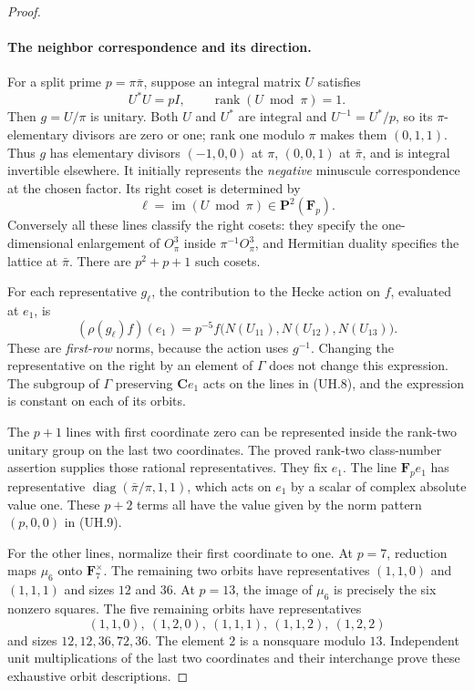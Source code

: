 \documentclass[11pt,a4paper]{article}
\theoremstyle{definition}
\begin{document}
\begin{proof}
\paragraph{The neighbor correspondence and its direction.}
For a split prime $p=\pi\bar\pi$, suppose an integral matrix $U$
satisfies
\[
 U^*U=pI,\qquad \operatorname{rank}(U\bmod\pi)=1.
 \tag{UH.7}
\]
Then $g=U/\pi$ is unitary.  Both $U$ and $U^*$ are integral and
$U^{-1}=U^*/p$, so its $\pi$-elementary divisors are zero or one;
rank one modulo $\pi$ makes them $(0,1,1)$.  Thus $g$ has elementary
divisors $(-1,0,0)$ at $\pi$, $(0,0,1)$ at $\bar\pi$, and is integral
invertible elsewhere.  It initially represents the \emph{negative}
minuscule correspondence at the chosen factor.  Its right coset is
determined by
\[
    \ell=\operatorname{im}(U\bmod\pi)\in\mathbf P^2(\mathbf F_p).
 \tag{UH.8}
\]
Conversely all these lines classify the right cosets: they specify
the one-dimensional enlargement of $O_\pi^3$ inside
$\pi^{-1}O_\pi^3$, and Hermitian duality specifies the lattice at
$\bar\pi$.  There are $p^2+p+1$ such cosets.

For each representative $g_\ell$, the contribution to the Hecke action
on $f$, evaluated at $e_1$, is
\[
 (\rho(g_\ell)f)(e_1)
   =p^{-5}f\bigl(N(U_{11}),N(U_{12}),N(U_{13})\bigr).
 \tag{UH.9}
\]
These are \emph{first-row} norms, because the action uses $g^{-1}$.
Changing the representative on the right by an element of $\Gamma$
does not change this expression.  The subgroup of $\Gamma$ preserving
$\mathbf Ce_1$ acts on the lines in (UH.8), and the expression is
constant on each of its orbits.

The $p+1$ lines with first coordinate zero can be represented inside
the rank-two unitary group on the last two coordinates.  The proved
rank-two class-number assertion supplies those rational representatives.
They fix $e_1$.  The line $\mathbf F_pe_1$ has representative
$\operatorname{diag}(\bar\pi/\pi,1,1)$, which acts on $e_1$ by a scalar
of complex absolute value one.  These $p+2$ terms all have the value
given by the norm pattern $(p,0,0)$ in (UH.9).

For the other lines, normalize their first coordinate to one.  At
$p=7$, reduction maps $\mu_6$ onto $\mathbf F_7^\times$.  The remaining
two orbits have representatives $(1,1,0)$ and $(1,1,1)$ and sizes
$12$ and $36$.  At $p=13$, the image of $\mu_6$ is precisely the six
nonzero squares.  The five remaining orbits have representatives
\[
 (1,1,0),\ (1,2,0),\ (1,1,1),\ (1,1,2),\ (1,2,2)
\]
and sizes $12,12,36,72,36$.  The element $2$ is a nonsquare modulo
$13$.  Independent unit multiplications of the last two coordinates
and their interchange prove these exhaustive orbit descriptions.


\end{proof}
\end{document}
